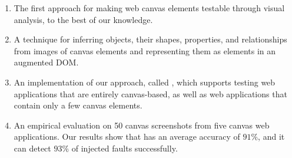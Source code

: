 \begin{enumerate}
\item The first approach for making web canvas elements testable through visual analysis, to the best of our knowledge.
\item A technique for inferring objects, their shapes, properties, and relationships from images of canvas elements and representing them as elements in an augmented DOM.
\item An implementation of our approach, called \tool, which supports testing web applications that are entirely canvas-based, as well as web applications that contain only a few canvas elements.
\item An empirical evaluation on 50 canvas screenshots from five canvas web applications. Our results show that \tool has an average accuracy of $91\%$, and it can detect $93\%$ of injected faults successfully.

\end{enumerate}
